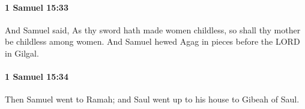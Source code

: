 		\paragraph{1 Samuel 15:33} %
			\label{1SAMUEL-15-33}

			And Samuel said, As thy sword hath made women childless, so shall thy mother be childless among women. And Samuel hewed Agag in pieces before the LORD in Gilgal.


		\paragraph{1 Samuel 15:34} %
			\label{1SAMUEL-15-34}

			Then Samuel went to Ramah; and Saul went up to his house to Gibeah of Saul.


